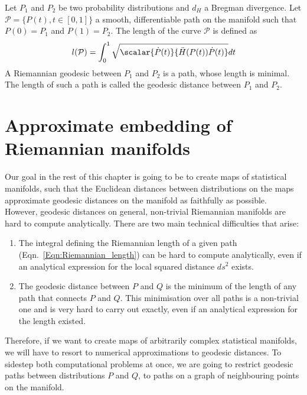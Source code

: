 \begin{definition}
	Let $P_1$ and $P_2$ be two probability distributions and $d_H$ a Bregman divergence. Let $\mathcal{P}=\{P(t),t\in[0,1]\}$ a smooth, differentiable path on the manifold such that $P(0)=P_1$ and $P(1)=P_2$. The length of the curve $\mathcal{P}$ is defined as
	\begin{equation}
		l(\mathcal{P}) = \int_{0}^{1} \sqrt{ \scalar{\dot{P}(t)}{\ddot{H}(P(t))\dot{P}(t)}} dt \label{Eqn:Riemannian_length}
	\end{equation}
	A Riemannian geodesic between $P_1$ and $P_2$ is a path, whose length is minimal. The length of such a path is called the geodesic distance between $P_1$ and $P_2$.
\end{definition}


\section{Approximate embedding of Riemannian manifolds}

Our goal in the rest of this chapter is going to be to create maps of statistical manifolds, such that the Euclidean distances between distributions on the maps approximate geodesic distances on the manifold as faithfully as possible. However, geodesic distances on general, non-trivial Riemannian manifolds are hard to compute analytically. There are two main technical difficulties that arise:

\begin{enumerate}
	\item The integral defining the Riemannian length of a given path (Eqn.\ \eqref{Eqn:Riemannian_length}) can be hard to compute analytically, even if an analytical expression for the local squared distance $ds^2$ exists.
	\item The geodesic distance between $P$ and $Q$ is the minimum of the length of any path that connects $P$ and $Q$. This minimisation over all paths is a non-trivial one and is very hard to carry out exactly, even if an analytical expression for the length existed.
\end{enumerate}

Therefore, if we want to create maps of arbitrarily complex statistical manifolds, we will have to resort to numerical approximations to geodesic distances. To sidestep both computational problems at once, we are going to restrict geodesic paths between distributions $P$ and $Q$, to paths on a graph of neighbouring points on the manifold.

